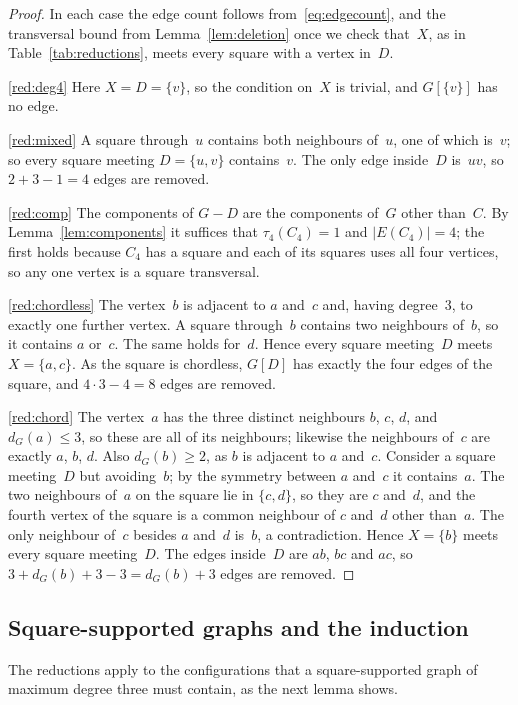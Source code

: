 \documentclass[11pt,letterpaper]{article}
\numberwithin{equation}{section}
\theoremstyle{plain}
\theoremstyle{definition}
\theoremstyle{remark}
\begin{document}
\begin{proof}
In each case the edge count follows from~\eqref{eq:edgecount}, and the transversal bound from Lemma~\ref{lem:deletion} once we check that~$X$, as in Table~\ref{tab:reductions}, meets every square with a vertex in~$D$.

\ref{red:deg4} Here $X=D=\{v\}$, so the condition on~$X$ is trivial, and $G[\{v\}]$ has no edge.

\ref{red:mixed} A square through~$u$ contains both neighbours of~$u$, one of which is~$v$; so every square meeting $D=\{u,v\}$ contains~$v$. The only edge inside~$D$ is~$uv$, so $2+3-1=4$ edges are removed.

\ref{red:comp} The components of $G-D$ are the components of~$G$ other than~$C$. By Lemma~\ref{lem:components} it suffices that $\tau_4(C_4)=1$ and $|E(C_4)|=4$; the first holds because $C_4$ has a square and each of its squares uses all four vertices, so any one vertex is a square transversal.

\ref{red:chordless} The vertex~$b$ is adjacent to $a$ and~$c$ and, having degree~$3$, to exactly one further vertex. A square through~$b$ contains two neighbours of~$b$, so it contains $a$ or~$c$. The same holds for~$d$. Hence every square meeting~$D$ meets $X=\{a,c\}$. As the square is chordless, $G[D]$ has exactly the four edges of the square, and $4\cdot3-4=8$ edges are removed.

\ref{red:chord} The vertex~$a$ has the three distinct neighbours $b$, $c$, $d$, and $d_G(a)\le3$, so these are all of its neighbours; likewise the neighbours of~$c$ are exactly $a$, $b$, $d$. Also $d_G(b)\ge2$, as $b$ is adjacent to $a$ and~$c$. Consider a square meeting~$D$ but avoiding~$b$; by the symmetry between $a$ and~$c$ it contains~$a$. The two neighbours of~$a$ on the square lie in $\{c,d\}$, so they are $c$ and~$d$, and the fourth vertex of the square is a common neighbour of $c$ and~$d$ other than~$a$. The only neighbour of~$c$ besides $a$ and~$d$ is~$b$, a contradiction. Hence $X=\{b\}$ meets every square meeting~$D$. The edges inside~$D$ are $ab$, $bc$ and $ac$, so $3+d_G(b)+3-3=d_G(b)+3$ edges are removed.
\end{proof}

\subsection{Square-supported graphs and the induction}

The reductions apply to the configurations that a square-supported graph of maximum degree three must contain, as the next lemma shows.
\end{document}
